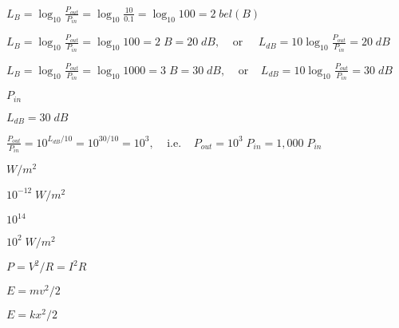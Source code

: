 \documentclass{article}
\def\lthtmlcheckvsize{\ifdim\ht\sizebox<\vsize 
  \ifdim\wd\sizebox<\hsize\expandafter\hfill\fi \expandafter\vfill
  \else\expandafter\vss\fi}%
\begin{document}
{\newpage\clearpage
{}%
$\displaystyle L_B=\log_{10} \frac{P_{out}}{P_{in}}=\log_{10} \frac{10}{0.1} =\log_{10} 100 =2\; bel(B)
$%
\lthtmlindisplaymathZ
\lthtmlcheckvsize\clearpage}

{\newpage\clearpage
{}%
$\displaystyle L_B=\log_{10}\frac{P_{out}}{P_{in}}=\log_{10} 100 =2\;B=20\;dB,
\;\;\;\;\mbox{or}\;\;\;\;\;
L_{dB}=10 \log_{10}\frac{P_{out}}{P_{in}}=20\;dB $%
\lthtmlindisplaymathZ
\lthtmlcheckvsize\clearpage}

{\newpage\clearpage
{}%
$\displaystyle L_B=\log_{10}\frac{P_{out}}{P_{in}}=\log_{10} 1000 =3\;B=30\;dB,
\;\;\;\;\mbox{or}\;\;\;\;
L_{dB}=10 \log_{10}\frac{P_{out}}{P_{in}}=30\;dB 
$%
\lthtmlindisplaymathZ
\lthtmlcheckvsize\clearpage}

{\newpage\clearpage
{}%
$P_{in}$%
\lthtmlindisplaymathZ
\lthtmlcheckvsize\clearpage}

{\newpage\clearpage
{}%
$L_{dB}=30\;dB$%
\lthtmlindisplaymathZ
\lthtmlcheckvsize\clearpage}

{\newpage\clearpage
{}%
$\displaystyle \frac{P_{out}}{P_{in}}=10^{L_{dB}/10}=10^{30/10}=10^3,
\;\;\;\;\mbox{i.e.}\;\;\;\;P_{out} =10^3\;P_{in}=1,000\;P_{in} 
$%
\lthtmlindisplaymathZ
\lthtmlcheckvsize\clearpage}

{\newpage\clearpage
{}%
$W/m^2$%
\lthtmlindisplaymathZ
\lthtmlcheckvsize\clearpage}

{\newpage\clearpage
{}%
$10^{-12}\; W/m^2$%
\lthtmlindisplaymathZ
\lthtmlcheckvsize\clearpage}

{\newpage\clearpage
{}%
$10^{14}$%
\lthtmlindisplaymathZ
\lthtmlcheckvsize\clearpage}

{\newpage\clearpage
{}%
$10^2\; W/m^2$%
\lthtmlindisplaymathZ
\lthtmlcheckvsize\clearpage}

{\newpage\clearpage
{}%
$P=V^2/R=I^2 R$%
\lthtmlindisplaymathZ
\lthtmlcheckvsize\clearpage}

{\newpage\clearpage
{}%
$E=mv^2/2$%
\lthtmlindisplaymathZ
\lthtmlcheckvsize\clearpage}

{\newpage\clearpage
{}%
$E=kx^2/2$%
\lthtmlindisplaymathZ
\lthtmlcheckvsize\clearpage}
\end{document}
